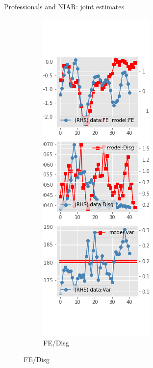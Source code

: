\documentclass{beamer}
\begin{document}
\begin{frame}{Professionals and NIAR: joint estimates}
\begin{figure}[ht]
\begin{subfigure}[b]{0.2\textwidth}
		\end{subfigure}
		\hfill
		\begin{subfigure}[b]{0.2\textwidth}
			\caption{FE/Disg}
			\includegraphics[width=\textwidth, height = 0.8\textheight]{figuresDraft/spf_ni_est_joint_diag2.png}
		\end{subfigure}
	\end{figure}
\end{frame}
\end{document}

